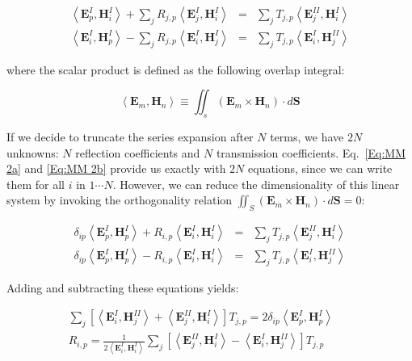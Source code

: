 \begin{eqnarray}
\left\langle \mathbf{E}^{I}_{p},\mathbf{H}^{I}_{i}\right\rangle +\sum _{j}R_{j,p}\left\langle \mathbf{E}^{I}_{j},\mathbf{H}^{I}_{i}\right\rangle  & = & \sum _{j}T_{j,p}\left\langle \mathbf{E}^{II}_{j},\mathbf{H}^{I}_{i}\right\rangle \label{Eq:MM 2a} \\
\left\langle \mathbf{E}^{I}_{i},\mathbf{H}^{I}_{p}\right\rangle -\sum _{j}R_{j,p}\left\langle \mathbf{E}^{I}_{i},\mathbf{H}^{I}_{j}\right\rangle  & = & \sum _{j}T_{j,p}\left\langle \mathbf{E}^{I}_{i},\mathbf{H}^{II}_{j}\right\rangle \label{Eq:MM 2b} 
\end{eqnarray}

where the scalar product is defined as the following overlap integral:

\begin{equation} 
\left\langle \mathbf{E}_{m},\mathbf{H}_{n}\right\rangle \equiv \iint _{s}\left( \mathbf{E}_{m}\times \mathbf{H}_{n}\right) \cdot d{\mathbf S}
\end{equation} 

If we decide to truncate the series expansion after $N$ terms, we have
$2N$ unknowns: $N$ reflection coefficients and $N$ transmission
coefficients. Eq.~\ref{Eq:MM 2a} and \ref{Eq:MM 2b} provide us exactly with
$2N$ equations, since we can write them for all $i$ in $1 \cdots N$.
However, we can reduce the dimensionality of this linear system by invoking
the orthogonality relation $\iint_{S}\left( \mathbf{E}_{m}\times \mathbf{H}_{n}\right) \cdot d{\mathbf S}=0$:

\begin{eqnarray}
\delta _{ip}\left\langle \mathbf{E}^{I}_{p},\mathbf{H}^{I}_{p}\right\rangle +R_{i,p}\left\langle \mathbf{E}^{I}_{i},\mathbf{H}^{I}_{i}\right\rangle  & = & \sum _{j}T_{j,p}\left\langle \mathbf{E}^{II}_{j},\mathbf{H}^{I}_{i}\right\rangle \label{Eq:MM 3a} \\
\delta _{ip}\left\langle \mathbf{E}^{I}_{p},\mathbf{H}^{I}_{p}\right\rangle -R_{i,p}\left\langle \mathbf{E}^{I}_{i},\mathbf{H}^{I}_{i}\right\rangle  & = & \sum _{j}T_{j,p}\left\langle \mathbf{E}^{I}_{i},\mathbf{H}^{II}_{j}\right\rangle \label{Eq:MM 3b} 
\end{eqnarray}

Adding and subtracting these equations yields:

\begin{eqnarray}
\sum _{j}\left[ \left\langle \mathbf{E}^{I}_{i},\mathbf{H}^{II}_{j}\right\rangle +\left\langle \mathbf{E}^{II}_{j},\mathbf{H}^{I}_{i}\right\rangle \right] T_{j,p}=2\delta _{ip}\left\langle \mathbf{E}^{I}_{p},\mathbf{H}^{I}_{p}\right\rangle  &  & \label{Eq:MM 4a} \\
R_{i,p}=\frac{1}{2\left\langle \mathbf{E}^{I}_{i},\mathbf{H}^{I}_{i}\right\rangle }\sum _{j}\left[ \left\langle \mathbf{E}^{II}_{j},\mathbf{H}^{I}_{i}\right\rangle -\left\langle \mathbf{E}^{I}_{i},\mathbf{H}^{II}_{j}\right\rangle \right] T_{j,p} &  & \label{Eq:MM 4b} 
\end{eqnarray}

